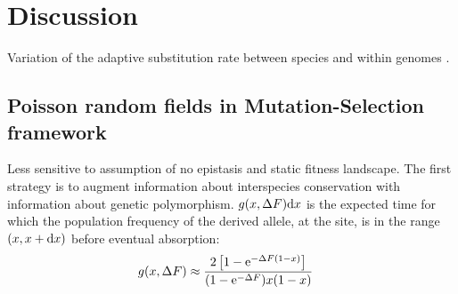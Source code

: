 \chapter{Discussion}
{
	\hypersetup{linkcolor=GREYDARK}
	\minitoc
}

Variation of the adaptive \gls{substitution} rate between species and within genomes \citep{Moutinho2019a}.


\section{Poisson random fields in Mutation-Selection framework}
Less sensitive to assumption of no epistasis and static fitness landscape.
The first strategy is to augment information about interspecies conservation with information about genetic polymorphism.
$g(x, {\Delta F}) \mathrm{d} x $ is the expected time for which the population frequency of the derived \gls{allele}, at the site, is in the range $(x, x+\mathrm{d} x)$ before eventual absorption:
\begin{align}
g(x, {\Delta F}) & \approx \dfrac{2 \left[ 1 - \mathrm{e}^{-{\Delta F} (1-x)}\right]}{(1 - \mathrm{e}^{-{\Delta F}})x(1-x)}
\end{align}

